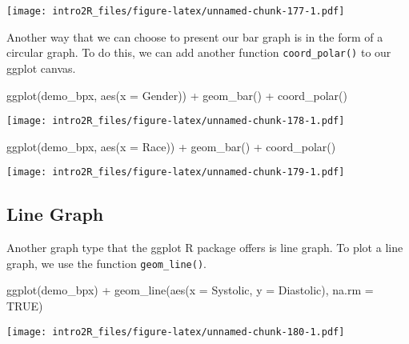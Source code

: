 \documentclass[
]{book}
\newenvironment{Shaded}{\begin{snugshade}}{\end{snugshade}}
\newcommand{\AttributeTok}[1]{\textcolor[rgb]{0.77,0.63,0.00}{#1}}
\newcommand{\ConstantTok}[1]{\textcolor[rgb]{0.00,0.00,0.00}{#1}}
\newcommand{\FunctionTok}[1]{\textcolor[rgb]{0.00,0.00,0.00}{#1}}
\newcommand{\NormalTok}[1]{#1}
\newcommand{\SpecialCharTok}[1]{\textcolor[rgb]{0.00,0.00,0.00}{#1}}
\begin{document}
\texttt{[image: intro2R\_files/figure-latex/unnamed-chunk-177-1.pdf]}

Another way that we can choose to present our bar graph is in the form of a circular graph. To do this, we can add another function \texttt{coord\_polar()} to our ggplot canvas.

\begin{Shaded}
\begin{Highlighting}[]
\FunctionTok{ggplot}\NormalTok{(demo\_bpx, }\FunctionTok{aes}\NormalTok{(}\AttributeTok{x =}\NormalTok{ Gender)) }\SpecialCharTok{+}
  \FunctionTok{geom\_bar}\NormalTok{() }\SpecialCharTok{+}
  \FunctionTok{coord\_polar}\NormalTok{()}
\end{Highlighting}
\end{Shaded}

\texttt{[image: intro2R\_files/figure-latex/unnamed-chunk-178-1.pdf]}

\begin{Shaded}
\begin{Highlighting}[]
\FunctionTok{ggplot}\NormalTok{(demo\_bpx, }\FunctionTok{aes}\NormalTok{(}\AttributeTok{x =}\NormalTok{ Race)) }\SpecialCharTok{+}
  \FunctionTok{geom\_bar}\NormalTok{() }\SpecialCharTok{+}
  \FunctionTok{coord\_polar}\NormalTok{()}
\end{Highlighting}
\end{Shaded}

\texttt{[image: intro2R\_files/figure-latex/unnamed-chunk-179-1.pdf]}

\hypertarget{line-graph}{%
\subsection{Line Graph}\label{line-graph}}

Another graph type that the ggplot R package offers is line graph. To plot a line graph, we use the function \texttt{geom\_line()}.

\begin{Shaded}
\begin{Highlighting}[]
\FunctionTok{ggplot}\NormalTok{(demo\_bpx) }\SpecialCharTok{+}
    \FunctionTok{geom\_line}\NormalTok{(}\FunctionTok{aes}\NormalTok{(}\AttributeTok{x =}\NormalTok{ Systolic, }\AttributeTok{y =}\NormalTok{ Diastolic), }\AttributeTok{na.rm =} \ConstantTok{TRUE}\NormalTok{)}
\end{Highlighting}
\end{Shaded}

\texttt{[image: intro2R\_files/figure-latex/unnamed-chunk-180-1.pdf]}
\end{document}

